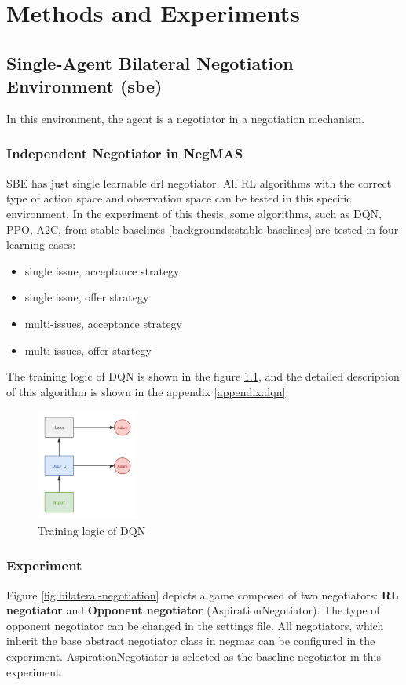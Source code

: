 \chapter{Methods and Experiments} \label{methods-and-experiments}

\section{Single-Agent Bilateral Negotiation Environment (\gls{sbe})}
In this environment, the agent is a negotiator in a negotiation mechanism.

\subsection{Independent Negotiator in NegMAS}
SBE has just single learnable \gls{drl} negotiator. All RL algorithms with the correct type of action space and observation space can be tested in this specific environment. In the experiment of this thesis, some algorithms, such as DQN, PPO, A2C, from stable-baselines \ref{backgrounds:stable-baselines} are tested in four learning cases:
\begin{itemize}
	\item single issue, acceptance strategy
	\item single issue, offer strategy
	\item multi-issues, acceptance strategy
	\item multi-issues, offer startegy
\end{itemize}

The training logic of DQN is shown in the figure \ref{fig:dqn}, and the detailed description of this algorithm is shown in the appendix \ref{appendix:dqn}.

\begin{figure}[htbp]
\centering
\includegraphics[width=0.30\textwidth]{./images/dqn.png}
\caption{Training logic of DQN}
\label{fig:dqn}
\end{figure}

\subsection{Experiment} \label{sbe:experiment}
Figure \ref{fig:bilateral-negotiation} depicts a game composed of two negotiators: \textbf{RL negotiator} and \textbf{Opponent negotiator} (AspirationNegotiator). The type of opponent negotiator can be changed in the settings file. All negotiators, which inherit the base abstract negotiator class in \gls{negmas} can be configured in the experiment. AspirationNegotiator is selected as the baseline negotiator in this experiment.

